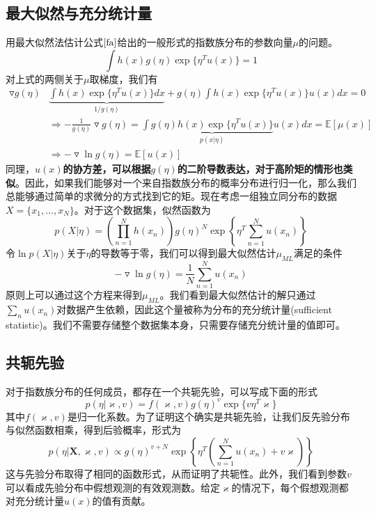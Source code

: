 \subsection*{最大似然与充分统计量}
用最大似然法估计公式$\ref{fa}$给出的一般形式的指数族分布的参数向量$\mu$的问题。
\begin{equation}
	\int h(x)g(\eta)\exp\{\eta^Tu(x)\}=1
\end{equation}
对上式的两侧关于$\mu$取梯度，我们有
\begin{equation}
\label{2226}
	\begin{aligned}
	\triangledown g(\eta)&\underbrace{\int h(x)\exp\{\eta^Tu(x) \}dx}_{1/g(\eta)}+g(\eta)\int h(x)\exp\{\eta^Tu(x) \}u(x)dx=0
	\\
	&\Rightarrow -\frac{1}{g(\eta)}\triangledown g(\eta)=\int \underbrace{g(\eta) h(x)\exp\{\eta^Tu(x) \}}_{p(x|\eta)}u(x)dx=\mathbb{E}[\mu(x)]\\
	&\Rightarrow -\triangledown \ln g(\eta)=\mathbb{E}[u(x)]
	\end{aligned}
\end{equation}
同理，\textbf{$u(x)$的协方差，可以根据$g(\eta)$的二阶导数表达，对于高阶矩的情形也类似}。因此，如果我们能够对一个来自指数族分布的概率分布进行归一化，那么我们总能够通过简单的求微分的方式找到它的矩。现在考虑一组独立同分布的数据$X=\{x_1,\dots,x_N \}$。对于这个数据集，似然函数为
\begin{equation}
	p(X|\eta)=\left(\prod_{n=1}^{N}h(x_n) \right)g(\eta )^N\exp\left\{\eta^T\sum_{n=1}^{N}u(x_n) \right\}
\end{equation}
令$\ln p(X|\eta)$关于$\eta$的导数等于零，我们可以得到最大似然估计$\mu_{ML}$满足的条件
\begin{equation}
	-\triangledown \ln g(\eta)=\frac{1}{N}\sum_{n=1}^{N}u(x_n)
\end{equation}
原则上可以通过这个方程来得到$\mu_{ML}$。我们看到最大似然估计的解只通过$\sum_{n}u(x_n)$对数据产生依赖，因此这个量被称为分布的充分统计量(sufficient statistic)。我们不需要存储整个数据集本身，只需要存储充分统计量的值即可。
\subsection*{共轭先验}
对于指数族分布的任何成员，都存在一个共轭先验，可以写成下面的形式
\begin{equation}
	p(\eta|\varkappa ,v)=f(\varkappa,v)g(\eta)^v\exp\{v\eta^T\varkappa \}
\end{equation}
其中$f(\varkappa,v)$是归一化系数。为了证明这个确实是共轭先验，让我们反先验分布与似然函数相乘，得到后验概率，形式为
\begin{equation}
	p(\eta|\boldsymbol{X},\varkappa,v)\propto g(\eta)^{v+N}\exp\left\{\eta^T\left(\sum_{n=1}^{N}u(x_n)+v\varkappa \right) \right\}
\end{equation}
这与先验分布取得了相同的函数形式，从而证明了共轭性。此外，我们看到参数$v$可以看成先验分布中假想观测的有效观测数。给定$\varkappa$的情况下，每个假想观测都对充分统计量$u(x)$的值有贡献。
